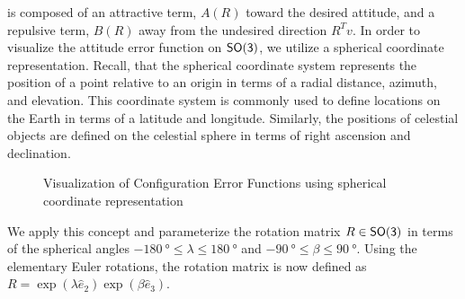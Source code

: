  is composed of an attractive term, \( A (R) \) toward the desired attitude, and a repulsive term, \( B(R) \) away from the undesired direction \( R^T v \).
In order to visualize the attitude error function on \( \mathsf{SO(3)} \), we utilize a spherical coordinate representation.
Recall, that the spherical coordinate system represents the position of a point relative to an origin in terms of a radial distance, azimuth, and elevation.
This coordinate system is commonly used to define locations on the Earth in terms of a latitude and longitude.
Similarly, the positions of celestial objects are defined on the celestial sphere in terms of right ascension and declination. 
\begin{figure}[htbp]%
    \centering 
    \caption{Visualization of Configuration Error Functions using spherical coordinate representation}
    \label{fig:config_error} 
\end{figure}%
We apply this concept and parameterize the rotation matrix \( R \in \mathsf{SO(3)} \) in terms of the spherical angles \( \SI{-180}{\degree} \leq \lambda \leq \SI{180}{\degree}  \) and \( \SI{-90}{\degree} \leq \beta \leq \SI{90}{\degree} \). 
Using the elementary Euler rotations, the rotation matrix is now defined as \( R = \exp( \lambda \hat{e}_2) \exp( \beta \hat{e}_3) \).
